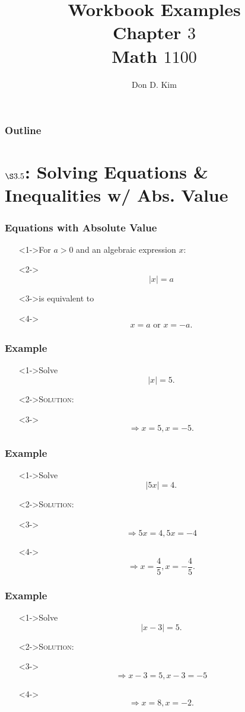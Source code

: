 \documentclass[handout]{beamer}
\title{Workbook Examples \\ Chapter $3$ \\ Math $1100$}
\author{Don D. Kim}
\date{\datefmt{\year}{\month}{\day}}
\begin{document}
\begin{frame}
	\titlepage
\end{frame}

\begin{frame}
	\frametitle{Outline}
	\tableofcontents
\end{frame}

\section{$\S 3.5$: Solving Equations \& Inequalities w/ Abs. Value}

\begin{frame}
  \frametitle{Equations with Absolute Value}
  \begin{enumerate}
    \item[]<1->For $a>0$ and an algebraic expression $x$:
    \item[]<2-> \[ |x|=a \]
    \item[]<3->is equivalent to
    \item[]<4->\[ x=a \text{ or } x=-a. \]
  \end{enumerate}
\end{frame}

\begin{frame}
  \frametitle{Example}
  \begin{enumerate}
    \item[]<1->Solve
      \[
        |x|=5.
      \]
    \item[]<2->\textsc{Solution:}
    \item[]<3->\[ \Rightarrow x=5, x=-5.\]
  \end{enumerate}
\end{frame}

\begin{frame}
  \frametitle{Example}
  \begin{enumerate}
    \item[]<1->Solve
      \[
        |5x|=4.
      \]
    \item[]<2->\textsc{Solution:}
    \item[]<3-> \[ \Rightarrow 5x=4, 5x=-4 \]
    \item[]<4-> \[ \Rightarrow x=\frac{4}{5}, x=-\frac{4}{5}.\]
  \end{enumerate}
\end{frame}

\begin{frame}
  \frametitle{Example}
  \begin{enumerate}
    \item[]<1->Solve
      \[
        |x-3|=5.
      \]
    \item[]<2->\textsc{Solution:}
    \item[]<3-> \[ \Rightarrow x-3=5, x-3=-5\]
    \item[]<4-> \[ \Rightarrow x=8, x=-2.\]
  \end{enumerate}
\end{frame}
\end{document}
